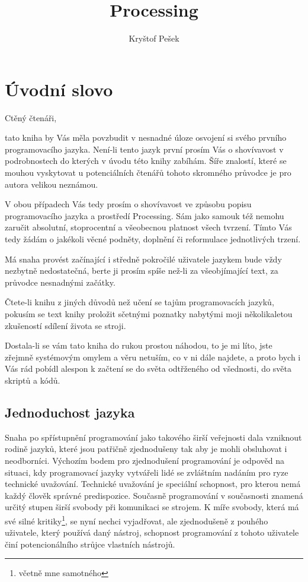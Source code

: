 \documentclass[11pt]{article} %
\title{Processing}
\author{Kryštof Pešek}
\date{} %
\begin{document}
\section{Úvodní slovo}

Ctěný čtenáři,

tato kniha by Vás měla povzbudit v nesnadné úloze osvojení si svého prvního programovacího jazyka. Není-li tento jazyk první prosím Vás o shovívavost v podrobnostech do kterých v úvodu této knihy zabíhám. Šíře znalostí, které se mouhou vyskytovat u potenciálních čtenářů tohoto skromného průvodce je pro autora velikou neznámou.

V obou případech Vás tedy prosím o shovívavost ve způsobu popisu programovacího jazyka a prostředí Processing. Sám jako samouk též nemohu zaručit absolutní, stoprocentní a všeobecnou platnost všech tvrzení. Tímto Vás tedy žádám o jakékoli věcné podněty, doplnění či reformulace jednotlivých trzení.

Má snaha provést začínající i středně pokročilé uživatele jazykem bude vždy nezbytně nedostatečná, berte ji prosím spíše než-li za všeobjímající text, za průvodce nesnadnými začátky.

Čtete-li knihu z jiných důvodů než učení se tajům programovacích jazyků, pokusím se text knihy proložit sčetnými poznatky nabytými moji několikaletou zkušeností sdílení života se stroji.

Dostala-li se vám tato kniha do rukou prostou náhodou, to je mi líto, jste zřejmně systémovým omylem a věru netuším, co v ni dále najdete, a proto bych i Vás rád pobídl alespon k začtení se do světa odtřženého od všednosti, do světa skriptů a kódů. 


\subsection{Jednoduchost jazyka}

Snaha po spřístupnění programování jako takového širší veřejnosti dala vzniknout rodině jazyků, které jsou patřičně zjednodušeny tak aby je mohli obsluhovat i neodborníci. Výchozím bodem pro zjednodušení programování je odpověd na situaci, kdy programovací jazyky vytvářeli lidé se zvláštním nadáním pro ryze technické uvažování. Technické uvažování je speciální schopnost, pro kterou nemá každý člověk správné predispozice. Současně programování v současnosti znamená určitý stupen širší svobody při komunikaci se strojem. K míře svobody, která má své silné kritiky\footnote{včetně mne samotného}, se nyní nechci vyjadřovat, ale zjednodušeně z pouhého uživatele, který používá daný nástroj, schopnost programování z tohoto uživatele činí potencionálního strůjce vlastních nástrojů.
\end{document}
